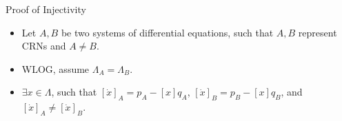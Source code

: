 \begin{frame}{Proof of Injectivity}
\begin{itemize}
\item Let $A, B$ be two systems of differential equations, such that $A, B$ represent CRNs and $A \neq B$.
\item WLOG, assume $\Lambda_{A} = \Lambda_{B}$.
\item $\exists x \in \Lambda$, such that $[\dot{x}]_{A} = p_{A} - [x]q_{A}$, $[\dot{x}]_{B} = p_{B} - [x]q_{B}$, and $[\dot{x}]_{A} \neq [\dot{x}]_{B}$.
\end{itemize}
\end{frame}
